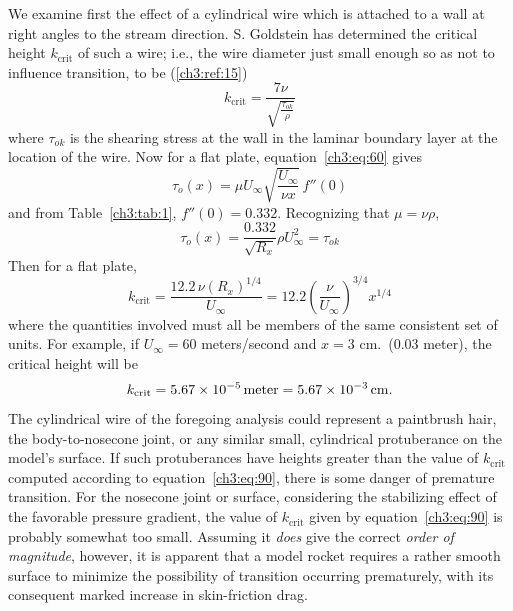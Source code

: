 We examine first the effect of a cylindrical wire which is
attached to a wall at right angles to the stream direction.
S. Goldstein has determined the critical height $k_{\mathrm{crit}}$ of such
a wire; i.e., the wire diameter just small enough so as not to
influence transition, to be (\ref{ch3:ref:15})
\begin{equation}\label{ch3:eq:87}
k_{\mathrm{crit}} = \frac{7\nu}{\sqrt{\frac{\tau_{ok}}{\rho}}}
\end{equation}
where $\tau_{ok}$ is the shearing stress at the wall in the laminar
boundary layer at the location of the wire. Now for a flat
plate, equation~\eqref{ch3:eq:60} gives
\begin{equation}\label{ch3:eq:88}
\tau_o(x) = \mu U_\infty\sqrt{\frac{U_\infty}{\nu x}}\,f''(0)
\end{equation}
and from Table~\ref{ch3:tab:1}, $f''(0) = 0.332$. Recognizing that $\mu = \nu\rho$,
\begin{equation}\label{ch3:eq:89}
\tau_o(x) = \frac{0.332}{\sqrt{R_x}}\rho U_\infty^{2} = \tau_{ok}
\end{equation}
Then for a flat plate,
\begin{equation}\label{ch3:eq:90}
k_{\mathrm{crit}} = \frac{12.2\,\nu(R_x)^{1/4}}{U_\infty}
  = 12.2\left(\frac{\nu}{U_\infty}\right)^{3/4}x^{1/4}
\end{equation}
where the quantities involved must all be members of the same
consistent set of units. For example, if $U_\infty = 60$ meters/second
and $x = 3$ cm.\ (0.03 meter), the critical height will be
\begin{equation*}
k_{\mathrm{crit}} = 5.67 \times 10^{-5}\,\mathrm{meter} = 5.67 \times 10^{-3}\,\mathrm{cm.}
\end{equation*}
The cylindrical wire of the foregoing analysis could represent
a paintbrush hair, the body-to-nosecone joint, or any similar
small, cylindrical protuberance on the model's surface. If
such protuberances have heights greater than the value of $k_{\mathrm{crit}}$
computed according to equation~\eqref{ch3:eq:90}, there is some danger of
premature transition. For the nosecone joint or surface,
considering the stabilizing effect of the favorable pressure
gradient, the value of $k_{\mathrm{crit}}$ given by equation~\eqref{ch3:eq:90} is probably
somewhat too small. Assuming it \emph{does} give the correct \emph{order
of magnitude}, however, it is apparent that a model rocket
requires a rather smooth surface to minimize the possibility of
transition occurring prematurely, with its consequent marked
increase in skin-friction drag.

